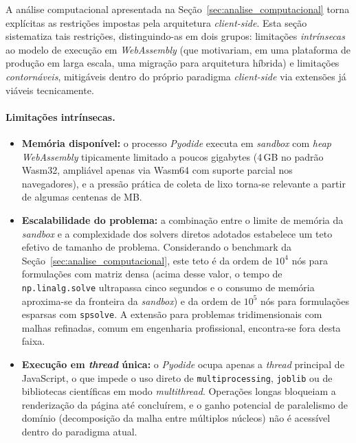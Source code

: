 A análise computacional apresentada na Seção~\ref{sec:analise_computacional} torna explícitas as restrições impostas pela arquitetura \textit{client-side}. Esta seção sistematiza tais restrições, distinguindo-as em dois grupos: limitações \textit{intrínsecas} ao modelo de execução em \textit{WebAssembly} (que motivariam, em uma plataforma de produção em larga escala, uma migração para arquitetura híbrida) e limitações \textit{contornáveis}, mitigáveis dentro do próprio paradigma \textit{client-side} via extensões já viáveis tecnicamente.

\paragraph{Limitações intrínsecas.}

\begin{itemize}
    \item \textbf{Memória disponível:} o processo \textit{Pyodide} executa em \textit{sandbox} com \textit{heap} \textit{WebAssembly} tipicamente limitado a poucos gigabytes (4\,GB no padrão Wasm32, ampliável apenas via Wasm64 com suporte parcial nos navegadores), e a pressão prática de coleta de lixo torna-se relevante a partir de algumas centenas de MB.

    \item \textbf{Escalabilidade do problema:} a combinação entre o limite de memória da \textit{sandbox} e a complexidade dos solvers diretos adotados estabelece um teto efetivo de tamanho de problema. Considerando o benchmark da Seção~\ref{sec:analise_computacional}, este teto é da ordem de $10^4$ nós para formulações com matriz densa (acima desse valor, o tempo de \texttt{np.linalg.solve} ultrapassa cinco segundos e o consumo de memória aproxima-se da fronteira da \textit{sandbox}) e da ordem de $10^5$ nós para formulações esparsas com \texttt{spsolve}. A extensão para problemas tridimensionais com malhas refinadas, comum em engenharia profissional, encontra-se fora desta faixa.

    \item \textbf{Execução em \textit{thread} única:} o \textit{Pyodide} ocupa apenas a \textit{thread} principal de JavaScript, o que impede o uso direto de \texttt{multiprocessing}, \texttt{joblib} ou de bibliotecas científicas em modo \textit{multithread}. Operações longas bloqueiam a renderização da página até concluírem, e o ganho potencial de paralelismo de domínio (decomposição da malha entre múltiplos núcleos) não é acessível dentro do paradigma atual.


\end{itemize}
